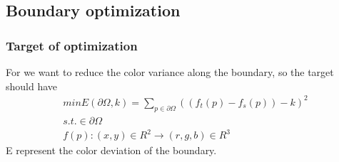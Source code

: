 \documentclass[letterpaper,12pt]{article}
\begin{document}
\subsection{Boundary optimization}
\subsubsection{Target of optimization}
For we want to reduce the color variance along the boundary, so the target should have
\begin{equation*}
\begin{aligned}
minE(\partial \Omega, k) = \sum_{p\in\partial\Omega}((f_t(p)-f_s(p))-k)^2 \\
s.t. \in \partial \Omega \\
f(p):(x,y)\in R^2\rightarrow(r,g,b) \in R^3
\end{aligned}
\end{equation*}
E represent the color deviation of the boundary.
\end{document}
